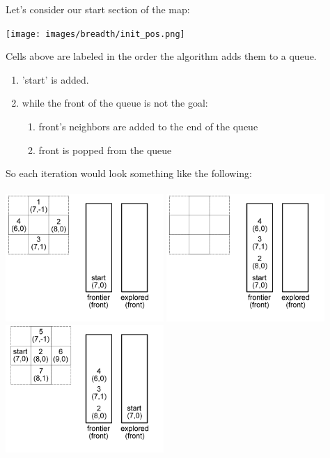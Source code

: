 \documentclass[12pt]{article}
\begin{document}
Let's consider our start section of the map:
\begin{center} \texttt{[image: images/breadth/init\_pos.png]} \end{center}
Cells above are labeled in the order the algorithm adds them to a queue.
\begin{enumerate}
\item 'start' is added.
\item while the front of the queue is not the goal:
\begin{enumerate}
 \item front's neighbors are added to the end of the queue
 \item front is popped from the queue
\end{enumerate}
\end{enumerate}
So each iteration would look something like the following:
\\ \\
\includegraphics[width=60mm]{images/breadth/pos01.png}
\includegraphics[width=60mm]{images/breadth/pos02.png}
\includegraphics[width=60mm]{images/breadth/pos03.png}
\end{document}
